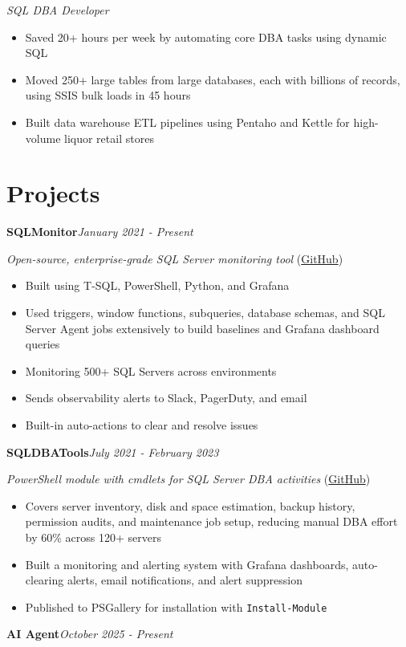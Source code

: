 \documentclass[10pt,a4paper]{article}
\begin{document}
\textit{SQL DBA Developer}\\[-5pt]
\begin{itemize}
  \item Saved 20+ hours per week by automating core DBA tasks using dynamic SQL
  \item Moved 250+ large tables from large databases, each with billions of records, using SSIS bulk loads in 45 hours
  \item Built data warehouse ETL pipelines using Pentaho and Kettle for high-volume liquor retail stores
\end{itemize}

\section{Projects}

\noindent\textbf{SQLMonitor}\hfill \textit{January 2021 - Present}

\textit{Open-source, enterprise-grade SQL Server monitoring tool} (\href{https://github.com/imajaydwivedi/SQLMonitor}{GitHub})
\begin{itemize}
  \item Built using T-SQL, PowerShell, Python, and Grafana
  \item Used triggers, window functions, subqueries, database schemas, and SQL Server Agent jobs extensively to build baselines and Grafana dashboard queries
  \item Monitoring 500+ SQL Servers across environments
  \item Sends observability alerts to Slack, PagerDuty, and email
  \item Built-in auto-actions to clear and resolve issues
\end{itemize}
\vspace{14.7pt}
\noindent\textbf{SQLDBATools}\hfill \textit{July 2021 - February 2023}

\textit{PowerShell module with cmdlets for SQL Server DBA activities} (\href{https://github.com/imajaydwivedi/SQLDBATools}{GitHub})
\begin{itemize}
  \item Covers server inventory, disk and space estimation, backup history, permission audits, and maintenance job setup, reducing manual DBA effort by 60\% across 120+ servers
  \item Built a monitoring and alerting system with Grafana dashboards, auto-clearing alerts, email notifications, and alert suppression
  \item Published to PSGallery for installation with \texttt{Install-Module}
\end{itemize}
\vspace{14.7pt}
\noindent\textbf{AI Agent}\hfill \textit{October 2025 - Present}
\end{document}
